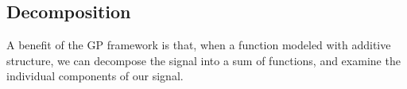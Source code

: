 \documentclass[twoside]{article}
\theoremstyle{definition}
\theoremstyle{remark}
\numberwithin{equation}{section}
\numberwithin{thm}{section}
\begin{document}






\subsection{Decomposition}

A benefit of the GP framework is that, when a function modeled with additive structure, we can decompose the signal into a sum of functions, and examine the individual components of our signal.

\end{document}
